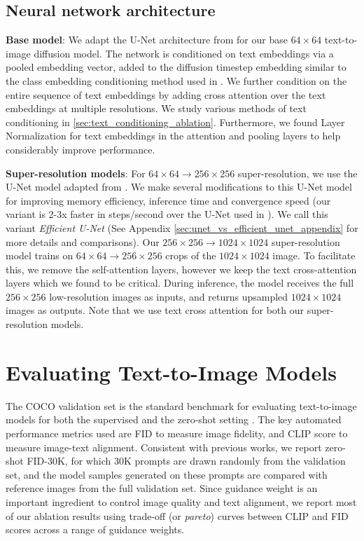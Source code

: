 \subsection{Neural network architecture}

\label{sec:architecture}
\textbf{Base model}: We adapt the U-Net architecture from \cite{nichol2021improved} for our base $64\times64$ text-to-image diffusion model. The network is conditioned on text embeddings via a pooled embedding vector, added to the diffusion timestep embedding similar to the class embedding conditioning method used in \cite{dhariwal2021diffusion, ho2021cascaded}. We further condition on the entire sequence of text embeddings by adding cross attention \cite{rombach-cvpr-2022} over the text embeddings at multiple resolutions. We study various methods of text conditioning in \ref{sec:text_conditioning_ablation}. Furthermore, we found Layer Normalization \cite{ba2016layer} for text embeddings in the attention and pooling layers to help considerably improve performance. 

\textbf{Super-resolution models}: For $64\times64 \rightarrow 256\times256$ super-resolution, we use the U-Net model adapted from \cite{nichol2021improved, sahariac-palette}. We make several modifications to this U-Net model for improving memory efficiency, inference time and convergence speed (our variant is 2-3x faster in steps/second over the U-Net used in \cite{nichol2021improved, sahariac-palette}). We call this variant \textit{Efficient U-Net} (See Appendix \ref{sec:unet_vs_efficient_unet_appendix} for more details and comparisons). Our $256\times256 \rightarrow 1024\times1024$ super-resolution model trains on $64\times64 \rightarrow 256\times 256$ crops of the $1024\times1024$ image. To facilitate this, we remove the self-attention layers, however we keep the text cross-attention layers which we found to be critical. During inference, the model receives the full $256\times256$ low-resolution images as inputs, and returns upsampled $1024\times1024$ images as outputs. Note that we use text cross attention for both our super-resolution models.

\section{Evaluating Text-to-Image Models}

The COCO \cite{lin-eccv-2014} validation set is the standard benchmark for evaluating text-to-image models for both the supervised \cite{zhou2021lafite, gafni2022make} and the zero-shot setting \cite{ramesh-dalle, nichol-glide}. The key automated performance metrics used are FID \cite{heusel2017gans} to measure image fidelity, and CLIP score \cite{hessel2021clipscore, radford-icml-2021} to measure image-text alignment. Consistent with previous works, we report zero-shot FID-30K, for which 30K prompts are drawn randomly from the validation set, and the model samples generated on these prompts are compared with reference images from the full validation set. Since guidance weight is an important ingredient to control image quality and text alignment, we report most of our ablation results using trade-off (or \textit{pareto}) curves between CLIP and FID scores across a range of guidance weights. 

